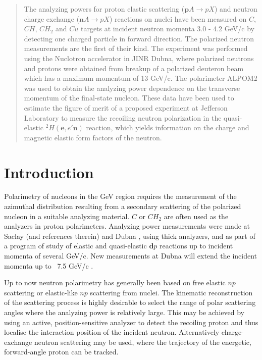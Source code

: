 \documentclass[twocolumn,epjc3]{svjour3}
\renewcommand{\vec}[1]{\boldsymbol{#1}} %
\begin{document}
\begin{abstract}
  The analyzing powers for proton elastic scattering ($\vec p A\to pX$) and neutron charge exchange ($\vec n A\to p X$) reactions on nuclei have been measured on $ C$, $CH$, $CH_2$ and $Cu$ targets at incident neutron momenta 3.0 - 4.2 GeV/c by detecting one charged particle in forward direction. The polarized neutron measurements are the first of their kind. The experiment was performed using the Nuclotron accelerator in JINR Dubna, where polarized neutrons and protons were obtained from breakup of a polarized deuteron beam which has a maximum momentum of 13 GeV/c. The polarimeter ALPOM2 was used to obtain the analyzing power dependence on the transverse momentum of the final-state nucleon. These data have been used to estimate the figure of merit of a proposed experiment at Jefferson Laboratory to measure the recoiling neutron polarization in the quasi-elastic $^2H(\vec e,e'\vec n)$ reaction, which yields information on the charge and magnetic elastic form factors of the neutron.
\end{abstract}

\section{Introduction}
Polarimetry of nucleons in the GeV region requires the measurement of the azimuthal distribution resulting from a secondary scattering of the polarized nucleon in a suitable analyzing material. $C$ or $CH_2$ are often used as the analyzers in proton polarimeters. Analyzing power measurements were made at Saclay \cite{Cheung:1995ei} (and references therein) and Dubna \cite{Azhgirey:2004yk}, using thick analyzers, and as part of a program of study of elastic and quasi-elastic $\vec d p$ reactions \cite{Lehar:2001wq} up to incident momenta of several GeV/c. New measurements at Dubna will extend the incident momenta up to ~7.5 GeV/c \cite{ALPOM2}.

Up to now neutron polarimetry has generally been based on free elastic $np$ scattering or elastic-like $np$ scattering from nuclei. The kinematic reconstruction of the scattering process is highly desirable to select the range of polar scattering angles where the analyzing power is relatively large. This may be achieved by using an active, position-sensitive analyzer to detect the recoiling proton and thus localise the interaction position of the incident neutron. Alternatively charge-exchange neutron scattering may be used, where the trajectory of the energetic, forward-angle proton can be tracked.
\end{document}
